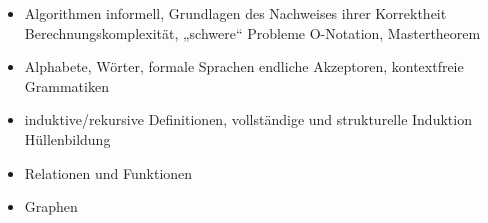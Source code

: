\begin{module}
\begin{content}
\begin{itemize}\item Algorithmen informell, Grundlagen des Nachweises ihrer Korrektheit\newline
Berechnungskomplexität, „schwere“ Probleme\newline
O-Notation, Mastertheorem  \item Alphabete, Wörter, formale Sprachen\newline
endliche Akzeptoren, kontextfreie Grammatiken  \item induktive/rekursive Definitionen, vollständige und strukturelle Induktion\newline
Hüllenbildung  \item Relationen und Funktionen  \item Graphen  \end{itemize}
\end{content}



\end{module}


